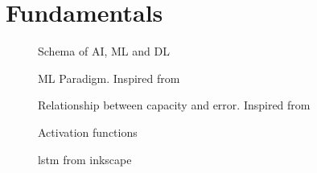 \chapter{Fundamentals}

\begin{figure}
	\centering
    \def\svgwidth{0.5\textwidth}
%    
    \caption{Schema of AI, ML and DL}
    \label{fig:ai_ml_dl}
\end{figure}


\begin{figure}
	\centering
    \def\svgwidth{0.5\textwidth}
%    
    \caption{ML Paradigm. Inspired from \cite{mlparadigm}}
    \label{fig:mlparadigm}
\end{figure}

\begin{figure}
	\centering
    \def\svgwidth{0.8\textwidth}
%    
    \caption{Relationship between capacity and error. Inspired from
    \cite{Goodfellow-et-al-2016}}
    \label{fig:overfittingunderfitting}
\end{figure}

\begin{figure}
	\begin{center}
	   \def\svgwidth{0.7\textwidth}
%    
	\end{center}
    \caption{Activation functions}
    \label{fig:activationfunctions}
\end{figure}

\begin{figure}[h]
	\begin{center}
	   \def\svgwidth{0.8\columnwidth}
%    
	\end{center}
    \caption{lstm from inkscape}
    \label{fig:lstmfrominkscpape}
\end{figure}

